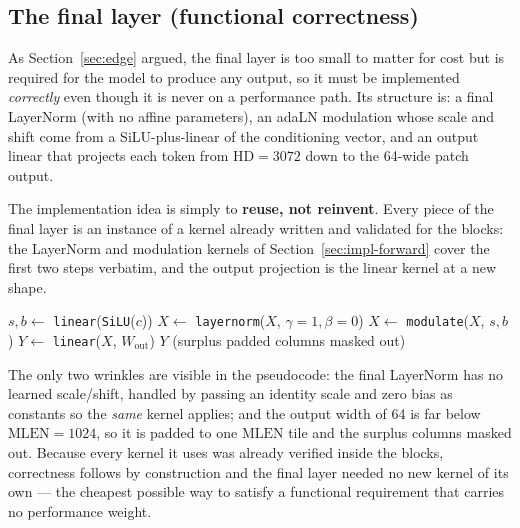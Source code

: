 \documentclass[11pt]{report}
\begin{document}
\subsection{The final layer (functional correctness)}
\label{sec:impl-final}

As Section~\ref{sec:edge} argued, the final layer is too small to matter for
cost but is required for the model to produce any output, so it must be
implemented \emph{correctly} even though it is never on a performance path.
Its structure is: a final LayerNorm (with no affine parameters), an adaLN
modulation whose scale and shift come from a SiLU-plus-linear of the
conditioning vector, and an output linear that projects each token from
$\text{HD}=3072$ down to the 64-wide patch output.

The implementation idea is simply to \textbf{reuse, not reinvent}. Every
piece of the final layer is an instance of a kernel already written and
validated for the blocks: the LayerNorm and modulation kernels of
Section~\ref{sec:impl-forward} cover the first two steps verbatim, and the
output projection is the linear kernel at a new shape.

\begin{algorithm}[H]
\DontPrintSemicolon
{}
$s, b \leftarrow$ \texttt{linear}(\texttt{SiLU}($c$)) 
$X \leftarrow$ \texttt{layernorm}($X$, $\gamma{=}1, \beta{=}0$) 
$X \leftarrow$ \texttt{modulate}($X$, $s, b$) 
$Y \leftarrow$ \texttt{linear}($X$, $W_{\text{out}}$) 
\Return $Y$ (surplus padded columns masked out)\;
\caption{Final layer: built entirely from already-validated block kernels}
\end{algorithm}

\noindent The only two wrinkles are visible in the pseudocode: the final
LayerNorm has no learned scale/shift, handled by passing an identity scale
and zero bias as constants so the \emph{same} kernel applies; and the output
width of 64 is far below $\text{MLEN}=1024$, so it is padded to one
$\text{MLEN}$ tile and the surplus columns masked out. Because every kernel
it uses was already verified inside the blocks, correctness follows by
construction and the final layer needed no new kernel of its own --- the
cheapest possible way to satisfy a functional requirement that carries no
performance weight.
\end{document}
